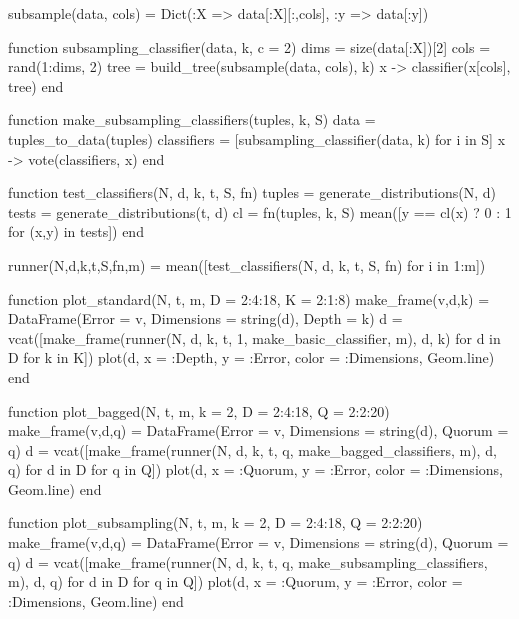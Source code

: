 \documentclass[a4paper,12pt]{article}
\begin{document}
\begin{juliacode}
subsample(data, cols) = Dict(:X => data[:X][:,cols], :y => data[:y])

function subsampling_classifier(data, k, c = 2)
    dims = size(data[:X])[2]
    cols = rand(1:dims, 2)
    tree = build_tree(subsample(data, cols), k)
    x -> classifier(x[cols], tree)
end

function make_subsampling_classifiers(tuples, k, S)
    data = tuples_to_data(tuples)
    classifiers = [subsampling_classifier(data, k) for i in S]
    x -> vote(classifiers, x)
end

function test_classifiers(N, d, k, t, S, fn)
    tuples = generate_distributions(N, d)
    tests = generate_distributions(t, d)
    cl = fn(tuples, k, S)
    mean([y == cl(x) ? 0 : 1 for (x,y) in tests])
end

runner(N,d,k,t,S,fn,m) = mean([test_classifiers(N, d, k, t, S, fn) for i in 1:m])

function plot_standard(N, t, m, D = 2:4:18, K = 2:1:8)
    make_frame(v,d,k) = DataFrame(Error = v, Dimensions = string(d), Depth = k)
    d = vcat([make_frame(runner(N, d, k, t, 1, make_basic_classifier, m), d, k) for d in D for k in K])
    plot(d, x = :Depth, y = :Error, color = :Dimensions, Geom.line)
end

function plot_bagged(N, t, m, k = 2, D = 2:4:18, Q = 2:2:20)
    make_frame(v,d,q) = DataFrame(Error = v, Dimensions = string(d), Quorum = q)
    d = vcat([make_frame(runner(N, d, k, t, q, make_bagged_classifiers, m), d, q) for d in D for q in Q])
    plot(d, x = :Quorum, y = :Error, color = :Dimensions, Geom.line)
end

function plot_subsampling(N, t, m, k = 2, D = 2:4:18, Q = 2:2:20)
    make_frame(v,d,q) = DataFrame(Error = v, Dimensions = string(d), Quorum = q)
    d = vcat([make_frame(runner(N, d, k, t, q, make_subsampling_classifiers, m), d, q) for d in D for q in Q])
    plot(d, x = :Quorum, y = :Error, color = :Dimensions, Geom.line)
end
\end{juliacode}
\end{document}

